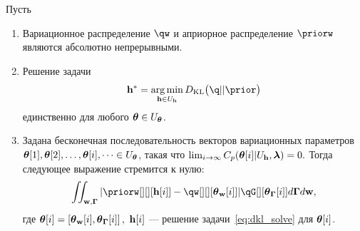 \begin{lemma}
\label{lem:pinsk}
Пусть
\begin{enumerate}
\item Вариационное распределение $\qw$ и априорное распределение $\priorw$  являются абсолютно непрерывными.

\item Решение задачи 
\begin{equation}
\label{eq:dkl_solve}
\h^{*} = \argmin_{\h \in \Uh} \KL{\q}{\prior}
\end{equation} единственно для любого $\boldsymbol{\theta} \in U_{\boldsymbol{\theta}}$.



\item Задана  бесконечная последовательность векторов вариационных параметров $\boldsymbol{\theta}[1],\boldsymbol{\theta}[2],\dots,\boldsymbol{\theta}[i],\dots \in U_{\boldsymbol{\theta}}$, такая что $\lim_{i \to \infty}C_p(\boldsymbol{\theta}[i]|U_{\mathbf{h}},\boldsymbol{\lambda}) = 0.$
Тогда следующее выражение стремится к нулю:
\[
 \iint_{\w,\G} |\priorw[][][{\h[i]}] - \qw[][][{\tetaw[i]}]| \qG[][{\tetaG[i]}] d\G d\w,
\]
где $\boldsymbol{\theta}[i] = \left[\boldsymbol{\theta}_\mathbf{w}[i], \boldsymbol{\theta}_{\boldsymbol{\Gamma}}[i]\right],$ $\mathbf{h}[i]$ --- решение задачи~\eqref{eq:dkl_solve} для $\boldsymbol{\theta}[i]$.

\end{enumerate}
\end{lemma}
